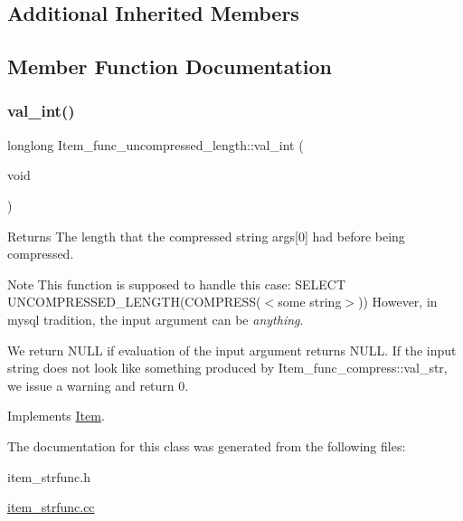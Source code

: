 \subsection*{Additional Inherited Members}


\subsection{Member Function Documentation}
\mbox{\label{classItem__func__uncompressed__length_aa0c950556a4e054e59f46eb86694f347}} 
\subsubsection{\texorpdfstring{val\+\_\+int()}{val\_int()}}
{\footnotesize\ttfamily longlong Item\+\_\+func\+\_\+uncompressed\+\_\+length\+::val\+\_\+int (\begin{DoxyParamCaption}\item[{void}]{ }\end{DoxyParamCaption})\hspace{0.3cm}{\ttfamily [virtual]}}

\begin{DoxyReturn}{Returns}
The length that the compressed string args\mbox{[}0\mbox{]} had before being compressed.
\end{DoxyReturn}
\begin{DoxyNote}{Note}
This function is supposed to handle this case\+: S\+E\+L\+E\+CT U\+N\+C\+O\+M\+P\+R\+E\+S\+S\+E\+D\+\_\+\+L\+E\+N\+G\+T\+H(\+C\+O\+M\+P\+R\+E\+S\+S($<$some string$>$)) However, in mysql tradition, the input argument can be {\itshape anything}.
\end{DoxyNote}
We return N\+U\+LL if evaluation of the input argument returns N\+U\+LL. If the input string does not look like something produced by Item\+\_\+func\+\_\+compress\+::val\+\_\+str, we issue a warning and return 0. 

Implements \mbox{\hyperlink{classItem}{Item}}.



The documentation for this class was generated from the following files\+:\begin{DoxyCompactItemize}
\item 
item\+\_\+strfunc.\+h\item 
\mbox{\hyperlink{item__strfunc_8cc}{item\+\_\+strfunc.\+cc}}\end{DoxyCompactItemize}
